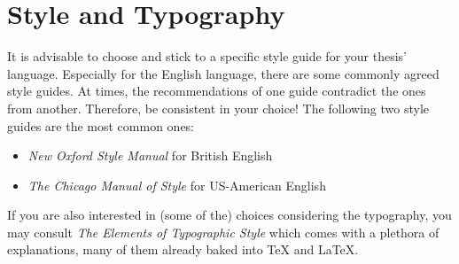   
% 
%        
% 
% 
%     
% 
%     
% 
%     

\section{Style and Typography}

It is advisable to choose and stick to a specific style guide for your thesis' language.
Especially for the English language, there are some commonly agreed style guides.
At times, the recommendations of one guide contradict the ones from another.
Therefore, be consistent in your choice!
The following two style guides are the most common ones:
\begin{itemize}
\item \emph{New Oxford Style Manual} for British English
\item \emph{The Chicago Manual of Style} for US-American English
\end{itemize}

If you are also interested in (some of the) choices considering the typography, you may
consult \emph{The Elements of Typographic Style} which comes with a plethora of explanations,
many of them already baked into \TeX{} and \LaTeX{}.

